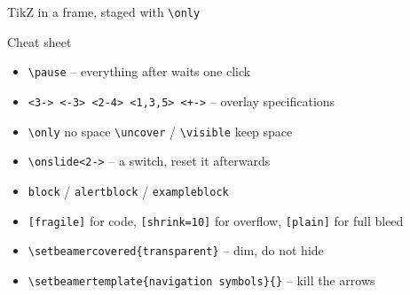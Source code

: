 \documentclass[aspectratio=169,11pt]{beamer}
\begin{document}
\begin{frame}{TikZ in a frame, staged with \texttt{\textbackslash only}}
\end{frame}

\begin{frame}{Cheat sheet}
    \begin{itemize}
        \item \texttt{\textbackslash pause} -- everything after waits one click
        \item \texttt{<3-> <-3> <2-4> <1,3,5> <+->} -- overlay specifications
        \item \texttt{\textbackslash only} no space \textbar{}
              \texttt{\textbackslash uncover} / \texttt{\textbackslash visible} keep space
        \item \texttt{\textbackslash onslide<2->} -- a switch, reset it afterwards
        \item \texttt{block} / \texttt{alertblock} / \texttt{exampleblock}
        \item \texttt{[fragile]} for code, \texttt{[shrink=10]} for overflow,
              \texttt{[plain]} for full bleed
        \item \texttt{\textbackslash setbeamercovered\{transparent\}} -- dim, do not hide
        \item \texttt{\textbackslash setbeamertemplate\{navigation symbols\}\{\}} -- kill the arrows
    \end{itemize}
\end{frame}
\end{document}
